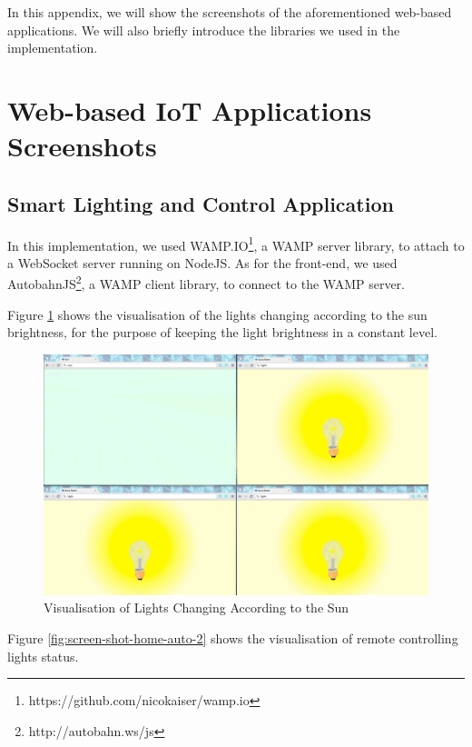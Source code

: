 \begin{appendices}
In this appendix, we will show the screenshots of the aforementioned web-based applications. We will also briefly introduce the libraries we used in the implementation. 

\section{Web-based IoT Applications Screenshots}

\subsection{Smart Lighting and Control Application}

In this implementation, we used WAMP.IO\footnote{https://github.com/nicokaiser/wamp.io}, a WAMP server library, to attach to a WebSocket server running on NodeJS. As for the front-end, we used AutobahnJS\footnote{http://autobahn.ws/js}, a WAMP client library, to connect to the WAMP server.

Figure \ref{fig:screen-shot-home-auto} shows the visualisation of the lights changing according to the sun brightness, for the purpose of keeping the light brightness in a constant level.

\begin{figure}[t]
  \begin{center}
    \includegraphics[width=1\textwidth]{images/screen-shot-home-auto.pdf}
    \caption{Visualisation of Lights Changing According to the Sun}
    \label{fig:screen-shot-home-auto}
  \end{center}
\end{figure}

Figure \ref{fig:screen-shot-home-auto-2} shows the visualisation of remote controlling lights status.


\end{appendices}
